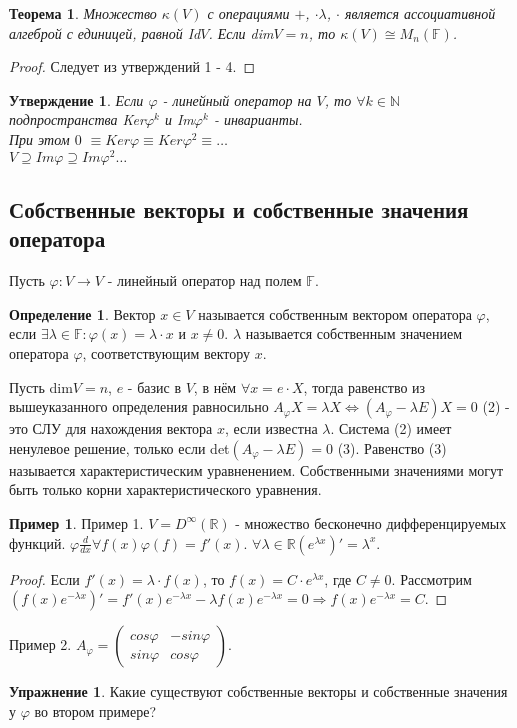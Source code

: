 \documentclass[a4paper, 12pt]{article}
\newcommand{\R}{\mathbb R}
\newcommand{\N}{\mathbb N}
\newcommand{\F}{\mathbb F}
\renewcommand{\phi}{\varphi}
\theoremstyle{definition}
\newtheorem*{definition}{Определение}
\newtheorem*{example1}{Пример}
\newtheorem*{exercise}{Упражнение}
\theoremstyle{plain}
\newtheorem*{theorem}{Теорема}
\newtheorem*{subtheorem}{Утверждение}
\theoremstyle{remark}
\begin{document}
  \begin{theorem}
    Множество $\kappa(V)$ с операциями $+$, $\cdot\lambda $, $\cdot$ является ассоциативной алгеброй с единицей, равной Id$V$.
    Если dim$V = n$, то $\kappa(V) \cong M_{n}(\F)$.
  \end{theorem}
  \begin{proof}
    Следует из утверждений 1 - 4.
  \end{proof}
  \begin{subtheorem}
    Если $\phi$ - линейный оператор на $V$, то $\forall k \in \N$ подпространства Ker$\phi^k$ и Im$\phi^k$ - инварианты.\\
    При этом {$0$} $\equiv Ker\phi \equiv Ker\phi^2 \equiv\ldots$\\
    $V \supseteq Im\phi \supseteq Im\phi^2\ldots$
  \end{subtheorem}
  \subsection{Собственные векторы и собственные значения оператора}
  Пусть $\phi: V \to V$ - линейный оператор над полем $\F$.
  \begin{definition}
    Вектор $x \in V$ называется собственным вектором оператора $\phi$, если $\exists\lambda\in \F: \phi(x) = \lambda \cdot x$ и $x\neq0$. $\lambda$ называется собственным значением оператора $\phi$, соответствующим вектору $x$.
  \end{definition}
  Пусть dim$V = n$, $e$ - базис в $V$, в нём $\forall x = e\cdot X$, тогда равенство из вышеуказанного определения равносильно $A_{\phi}X = \lambda X \Longleftrightarrow (A_{\phi} - \lambda E)X = 0$ (2) - это СЛУ для нахождения вектора $x$, если известна $\lambda$.
  Система (2) имеет ненулевое решение, только если det$(A_{\phi} - \lambda E) = 0$ (3).
  Равенство (3) называется характеристическим уравненением.
  Собственными значениями могут быть только корни характеристического уравнения.
  \begin{example1}
    Пример 1.
    $V = D^{\infty}(\R)$ - множество бесконечно дифференцируемых функций.
    $\phi \frac{d}{dx} \forall f(x) \phi(f) = f'(x)$.
    $\forall\lambda\in\R (e^{\lambda x})' = \lambda^x$.
    \begin{proof}
      Если $f'(x) = \lambda \cdot f(x)$, то $f(x) = C \cdot e^{\lambda x}$, где $C\neq0$.
      Рассмотрим $(f(x)e^{-\lambda x})' = f'(x)e^{-\lambda x} - \lambda f(x)e^{-\lambda x} = 0 \Longrightarrow f(x)e^{-\lambda x} = C$.
    \end{proof}
    Пример 2.
    $A_{\phi} = \begin{pmatrix}
      cos\phi & -sin\phi\\
      sin\phi & cos\phi
    \end{pmatrix}$.
    \begin{exercise}
      Какие существуют собственные векторы и собственные значения у $\phi$ во втором примере?
    \end{exercise}
  \end{example1}
\end{document}
